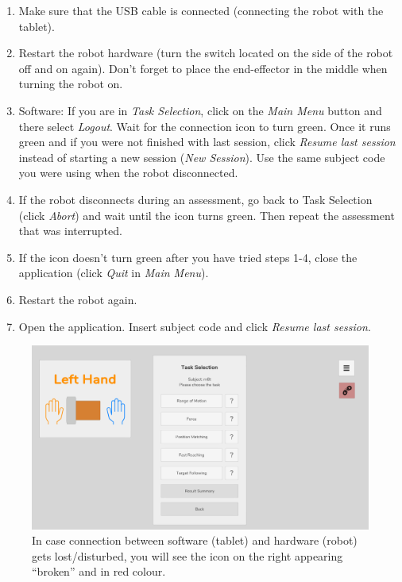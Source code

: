 \documentclass[10pt,oneside,a4paper]{article}
\begin{document}
\begin{enumerate}
\item Make sure that the USB cable is connected (connecting the robot with the tablet). 
\item Restart the robot hardware (turn the switch located on the side of the robot off and on again). Don’t forget to place the end-effector in the middle when turning the robot on. 
\item Software: If you are in \emph{Task Selection}, click on the \emph{Main Menu} button and there select \emph{Logout}. Wait for the connection icon to turn green. Once it runs green and if you were not finished with last session, click \emph{Resume last session} instead of starting a new session (\emph{New Session}). Use the same subject code you were using when the robot disconnected.  
\item If the robot disconnects during an assessment, go back to Task Selection (click \emph{Abort}) and wait until the icon turns green. Then repeat the assessment that was interrupted. 
\item If the icon doesn’t turn green after you have tried steps 1-4, close the application (click \emph{Quit} in \emph{Main Menu}). 
\item Restart the robot again. 
\item Open the application.  Insert subject code and click \emph{Resume last session}.
\end{enumerate}

\begin{figure}[h!]
\begin{center}
\includegraphics[width=\columnwidth]{images/Troubleshooting/SoftwareDisconnects.png}
\caption{In case connection between software (tablet) and hardware (robot) gets lost/disturbed, you will see the icon on the right appearing “broken” and in red colour.}
\label{fig:Disconnection}
\end{center}
\end{figure}
\end{document}
